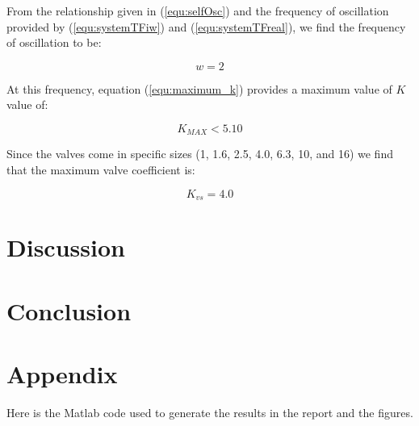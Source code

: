 \documentclass[a4paper, titlepage]{article}
\begin{document}
From the relationship given in (\ref{equ:selfOsc}) and the frequency of oscillation provided by (\ref{equ:systemTFiw}) and (\ref{equ:systemTFreal}), we find the frequency of oscillation to be:

\begin{equation}
w=2
\label{equ:omega_zero}
\end{equation}

At this frequency, equation (\ref{equ:maximum_k}) provides a maximum value of $K$ value of:

\begin{equation}
K_{MAX} < 5.10
\label{equ:k_valid}
\end{equation}

Since the valves come in specific sizes (1, 1.6, 2.5, 4.0, 6.3, 10, and 16) we find that the maximum valve coefficient is:

\begin{equation}
K_{vs} = 4.0
\label{equ:k_max}
\end{equation}


\section{Discussion}
\section{Conclusion}




\clearpage


\clearpage
\appendix

\section{Appendix}
Here is the Matlab code used to generate the results in the report and the figures.


\end{document}
